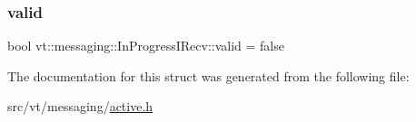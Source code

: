 \subsubsection{\texorpdfstring{valid}{valid}}
{\footnotesize\ttfamily bool vt\+::messaging\+::\+In\+Progress\+I\+Recv\+::valid = false}



The documentation for this struct was generated from the following file\+:\begin{DoxyCompactItemize}
\item 
src/vt/messaging/\hyperlink{active_8h}{active.\+h}\end{DoxyCompactItemize}
